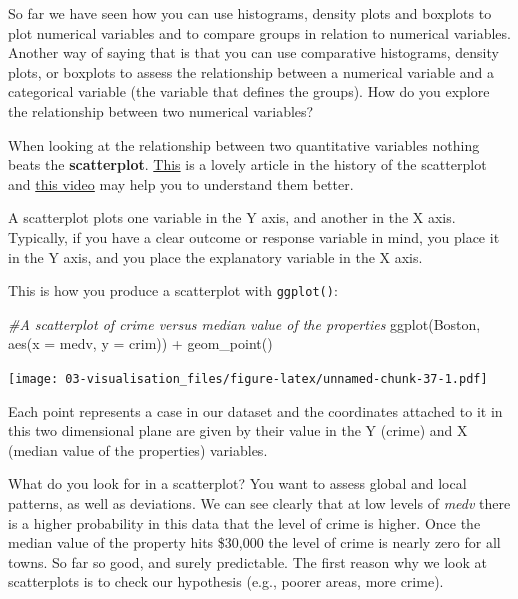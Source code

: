 \documentclass[
]{book}
\newenvironment{Shaded}{\begin{snugshade}}{\end{snugshade}}
\newcommand{\AttributeTok}[1]{\textcolor[rgb]{0.77,0.63,0.00}{#1}}
\newcommand{\CommentTok}[1]{\textcolor[rgb]{0.56,0.35,0.01}{\textit{#1}}}
\newcommand{\FunctionTok}[1]{\textcolor[rgb]{0.00,0.00,0.00}{#1}}
\newcommand{\NormalTok}[1]{#1}
\newcommand{\SpecialCharTok}[1]{\textcolor[rgb]{0.00,0.00,0.00}{#1}}
\begin{document}
So far we have seen how you can use histograms, density plots and boxplots to plot numerical variables and to compare groups in relation to numerical variables. Another way of saying that is that you can use comparative histograms, density plots, or boxplots to assess the relationship between a numerical variable and a categorical variable (the variable that defines the groups). How do you explore the relationship between two numerical variables?

When looking at the relationship between two quantitative variables nothing beats the \textbf{scatterplot}. \href{http://www.datavis.ca/papers/friendly-scat.pdf}{This} is a lovely article in the history of the scatterplot and \href{http://www.learner.org/courses/againstallodds/unitpages/unit10.html}{this video} may help you to understand them better.

A scatterplot plots one variable in the Y axis, and another in the X axis. Typically, if you have a clear outcome or response variable in mind, you place it in the Y axis, and you place the explanatory variable in the X axis.

This is how you produce a scatterplot with \texttt{ggplot()}:

\begin{Shaded}
\begin{Highlighting}[]
\CommentTok{\#A scatterplot of crime versus median value of the properties}
\FunctionTok{ggplot}\NormalTok{(Boston, }\FunctionTok{aes}\NormalTok{(}\AttributeTok{x =}\NormalTok{ medv, }\AttributeTok{y =}\NormalTok{ crim)) }\SpecialCharTok{+}
  \FunctionTok{geom\_point}\NormalTok{()}
\end{Highlighting}
\end{Shaded}

\texttt{[image: 03-visualisation\_files/figure-latex/unnamed-chunk-37-1.pdf]}

Each point represents a case in our dataset and the coordinates attached to it in this two dimensional plane are given by their value in the Y (crime) and X (median value of the properties) variables.

What do you look for in a scatterplot? You want to assess global and local patterns, as well as deviations. We can see clearly that at low levels of \emph{medv} there is a higher probability in this data that the level of crime is higher. Once the median value of the property hits \$30,000 the level of crime is nearly zero for all towns. So far so good, and surely predictable. The first reason why we look at scatterplots is to check our hypothesis (e.g., poorer areas, more crime).
\end{document}
